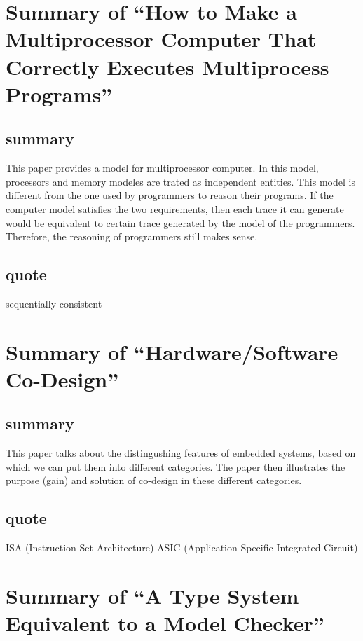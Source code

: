 \documentclass{llncs}
\begin{document}
\newpage
\section{Summary of ``How to Make a Multiprocessor Computer That Correctly Executes Multiprocess Programs''\cite{Lamport1979How}} 
  \label{section:multi_processer_program}
\subsection{summary}
This paper provides a model for multiprocessor computer. In this model,
processors and memory modeles are trated as independent entities. This model is
different from the one used by programmers to reason their programs. If the
computer model satisfies the two requirements, then each trace it can generate
would be equivalent to certain trace generated by the model of the programmers.
Therefore, the reasoning of programmers still makes sense.

\subsection{quote}
sequentially consistent


\newpage
\section{Summary of ``Hardware/Software Co-Design''\cite{DeMicheli1997HardwareSoftware}} 
  \label{section:hw_sw_codesign}
\subsection{summary}
This paper talks about the distingushing features of embedded systems, based on
which we can put them into different categories. The paper then illustrates the
purpose (gain) and solution of co-design in these different categories.

\subsection{quote}
ISA (Instruction Set Architecture)
ASIC (Application Specific Integrated Circuit)


\newpage
\section{Summary of ``A Type System Equivalent to a Model Checker''\cite{Naik2008Type}} 
  \label{section:type_eq_model_checker}
\end{document}
